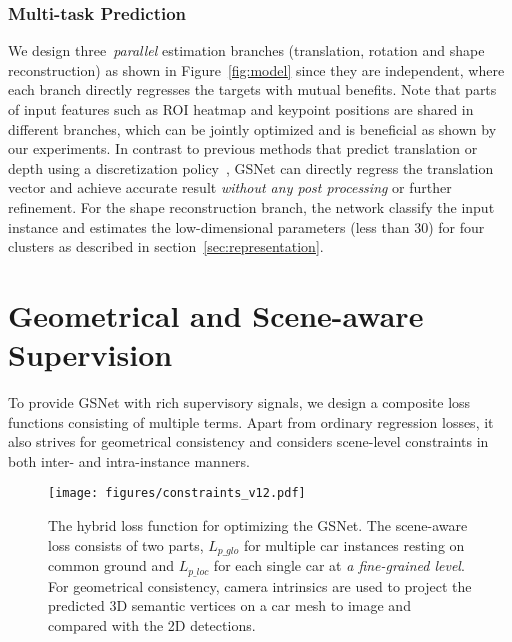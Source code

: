 \documentclass[runningheads]{llncs}
\begin{document}
\subsubsection{Multi-task Prediction}
\label{sec:output} 
We design three~\textit{parallel} estimation branches (translation, rotation and shape reconstruction) as shown in Figure~\ref{fig:model} since they are independent, where each branch directly regresses the targets with mutual benefits. Note that parts of input features such as ROI heatmap and keypoint positions are shared in different branches, which can be jointly optimized and is beneficial as shown by our experiments. In contrast to previous methods that predict translation or depth using a discretization policy~\cite{fu2018deep}, GSNet can directly regress the translation vector and achieve accurate result \textit{without any post processing} or further refinement. For the shape reconstruction branch, the network classify the input instance and estimates the low-dimensional parameters (less than 30) for four clusters as described in section~\ref{sec:representation}.  
\section{Geometrical and Scene-aware Supervision}
\label{sec:constraint} 
To provide GSNet with rich supervisory signals, we design a composite loss functions consisting of multiple terms. Apart from ordinary regression losses, it also strives for geometrical consistency and considers scene-level constraints in both inter- and intra-instance manners.


\begin{figure}[!t]
	\centering
\texttt{[image: figures/constraints\_v12.pdf]}
	\caption{The hybrid loss function for optimizing the GSNet. The scene-aware loss consists of two parts,  $L_{p\_{glo}}$ for multiple car instances resting on common ground and $L_{p\_{loc}}$ for each single car at \textit{a fine-grained level}. For geometrical consistency, camera intrinsics are used to project the predicted 3D semantic vertices on a car mesh to image and compared with the 2D detections.} 
	\label{fig:example3}
\end{figure}
\end{document}
